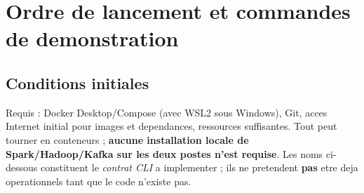 \documentclass[10pt,a4paper]{article}
\begin{document}
\section{Ordre de lancement et commandes de demonstration}
\subsection{Conditions initiales}
Requis : Docker Desktop/Compose (avec WSL2 sous Windows), Git, acces Internet initial pour images et dependances, ressources suffisantes. Tout peut tourner en conteneurs ; \textbf{aucune installation locale de Spark/Hadoop/Kafka sur les deux postes n'est requise}. Les noms ci-dessous constituent le \emph{contrat CLI} a implementer ; ils ne pretendent \textbf{pas} etre deja operationnels tant que le code n'existe pas.
\end{document}
